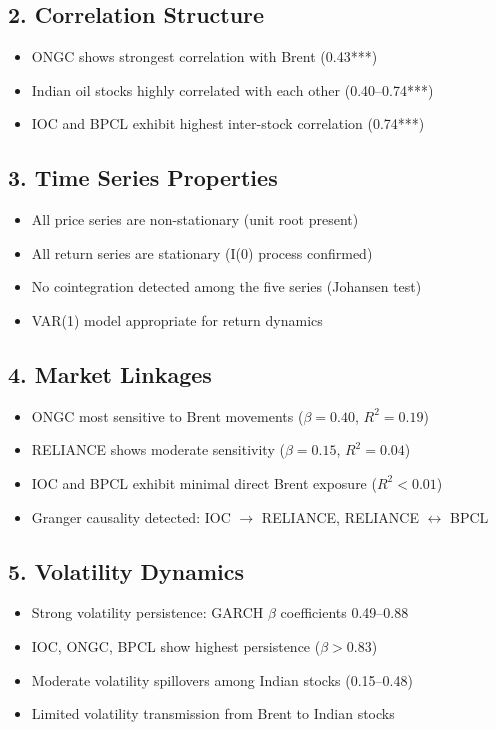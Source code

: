 \documentclass[11pt]{article}
\begin{document}
\subsection*{2. Correlation Structure}
\begin{itemize}
    \item ONGC shows strongest correlation with Brent (0.43***)
    \item Indian oil stocks highly correlated with each other (0.40--0.74***)
    \item IOC and BPCL exhibit highest inter-stock correlation (0.74***)
\end{itemize}

\subsection*{3. Time Series Properties}
\begin{itemize}
    \item All price series are non-stationary (unit root present)
    \item All return series are stationary (I(0) process confirmed)
    \item No cointegration detected among the five series (Johansen test)
    \item VAR(1) model appropriate for return dynamics
\end{itemize}

\subsection*{4. Market Linkages}
\begin{itemize}
    \item ONGC most sensitive to Brent movements ($\beta = 0.40$, $R^2 = 0.19$)
    \item RELIANCE shows moderate sensitivity ($\beta = 0.15$, $R^2 = 0.04$)
    \item IOC and BPCL exhibit minimal direct Brent exposure ($R^2 < 0.01$)
    \item Granger causality detected: IOC $\rightarrow$ RELIANCE, RELIANCE $\leftrightarrow$ BPCL
\end{itemize}

\subsection*{5. Volatility Dynamics}
\begin{itemize}
    \item Strong volatility persistence: GARCH $\beta$ coefficients 0.49--0.88
    \item IOC, ONGC, BPCL show highest persistence ($\beta > 0.83$)
    \item Moderate volatility spillovers among Indian stocks (0.15--0.48)
    \item Limited volatility transmission from Brent to Indian stocks
\end{itemize}
\end{document}
